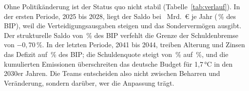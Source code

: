 Ohne Politikänderung ist der Status quo nicht stabil
(Tabelle~\ref{tab:verlauf}). In der ersten Periode, 2025 bis 2028, liegt der
Saldo bei \SQsaldo~Mrd.~\euro{} je Jahr (\SQsaldoPct\,\% des BIP), weil die
Verteidigungsausgaben steigen und das Sondervermögen ausgibt. Der strukturelle
Saldo von \SQstruktur\,\% des BIP verfehlt die Grenze der Schuldenbremse von
$-0{,}70\,\%$. In der letzten Periode, 2041 bis 2044, treiben Alterung und
Zinsen das Defizit auf \SQsaldoPctEnde\,\% des BIP; die Schuldenquote steigt
von \SQschuldStart\,\%
auf \SQschuldEnde\,\%, und die kumulierten Emissionen überschreiten das
deutsche Budget für 1,7\,°C in den 2030er Jahren. Die Teams entscheiden also
nicht zwischen Beharren und Veränderung, sondern darüber, wer die Anpassung
trägt.

\begin{table}[t]
\centering\small
\caption{Status quo über fünf Perioden. BIP und Schuldenquote zu Beginn der
Periode, übrige Größen als Jahreswert der Periode; \COz{} kumuliert seit 2025
zu Periodenbeginn.}
\label{tab:verlauf}

\end{table}
